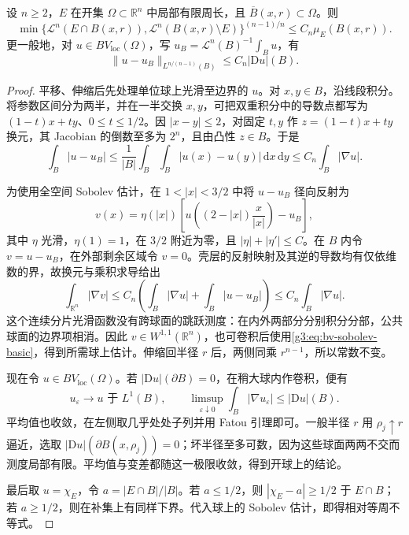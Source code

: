 \begin{theorem}\label{g3:thm:relative-isoperimetric-ball}
	设 \(n\ge2\)，\(E\) 在开集 \(\Omega\subset\mathbb R^n\) 中局部有限周长，且 \(\overline B(x,r)\subset\Omega\)。则
	\begin{equation}\label{g3:eq:relative-isoperimetric-ball}
		\min\{\mathcal L^n(E\cap B(x,r)),\mathcal L^n(B(x,r)\setminus E)\}^{(n-1)/n}
		\le C_n\mu_E(B(x,r)).
	\end{equation}
	更一般地，对 \(u\in BV_{\mathrm{loc}}(\Omega)\)，写 \(u_B=\mathcal L^n(B)^{-1}\int_Bu\)，有
	\[
		\|u-u_B\|_{L^{n/(n-1)}(B)}\le C_n|\mathrm Du|(B).
	\]
\end{theorem}
\begin{proof}
	平移、伸缩后先处理单位球上光滑至边界的 \(u\)。对 \(x,y\in B\)，沿线段积分。将参数区间分为两半，并在一半交换 \(x,y\)，可把双重积分中的导数点都写为 \((1-t)x+ty\)、\(0\le t\le1/2\)。因 \(|x-y|\le2\)，对固定 \(t,y\) 作 \(z=(1-t)x+ty\) 换元，其 Jacobian 的倒数至多为 \(2^n\)，且由凸性 \(z\in B\)。于是
	\[
		\int_B|u-u_B|
		\le\frac1{|B|}\int_B\int_B|u(x)-u(y)|\,\mathrm dx\,\mathrm dy
		\le C_n\int_B|\nabla u|.
	\]

	为使用全空间 Sobolev 估计，在 \(1<|x|<3/2\) 中将 \(u-u_B\) 径向反射为
	\[
		v(x)=\eta(|x|)
		\left[u\!\left((2-|x|)\frac{x}{|x|}\right)-u_B\right],
	\]
	其中 \(\eta\) 光滑，\(\eta(1)=1\)，在 \(3/2\) 附近为零，且 \(|\eta|+|\eta'|\le C\)。在 \(B\) 内令 \(v=u-u_B\)，在外部剩余区域令 \(v=0\)。壳层的反射映射及其逆的导数均有仅依维数的界，故换元与乘积求导给出
	\[
		\int_{\mathbb R^n}|\nabla v|
		\le C_n\left(\int_B|\nabla u|+\int_B|u-u_B|\right)
		\le C_n\int_B|\nabla u|.
	\]
	这个连续分片光滑函数没有跨球面的跳跃测度：在内外两部分分别积分分部，公共球面的边界项相消。因此 \(v\in W^{1,1}(\mathbb R^n)\)，也可卷积后使用\eqref{g3:eq:bv-sobolev-basic}，得到所需球上估计。伸缩回半径 \(r\) 后，两侧同乘 \(r^{n-1}\)，所以常数不变。

	现在令 \(u\in BV_{\mathrm{loc}}(\Omega)\)。若 \(|\mathrm Du|(\partial B)=0\)，在稍大球内作卷积，便有
	\[
		u_\varepsilon\to u\text{ 于 }L^1(B),\qquad
		\limsup_{\varepsilon\downarrow0}\int_B|\nabla u_\varepsilon|
		\le|\mathrm Du|(B).
	\]
	平均值也收敛，在左侧取几乎处处子列并用 Fatou 引理即可。一般半径 \(r\) 用 \(\rho_j\uparrow r\) 逼近，选取 \(|\mathrm Du|(\partial B(x,\rho_j))=0\)；坏半径至多可数，因为这些球面两两不交而测度局部有限。平均值与变差都随这一极限收敛，得到开球上的结论。

	最后取 \(u=\chi_E\)，令 \(a=|E\cap B|/|B|\)。若 \(a\le1/2\)，则 \(|\chi_E-a|\ge1/2\) 于 \(E\cap B\)；若 \(a\ge1/2\)，则在补集上有同样下界。代入球上的 Sobolev 估计，即得相对等周不等式。
\end{proof}

